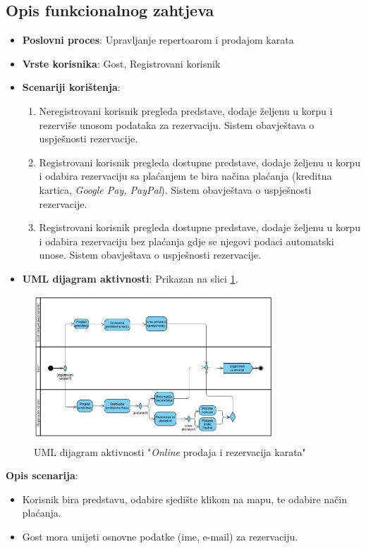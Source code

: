 \subsection{Opis funkcionalnog zahtjeva}  
\begin{itemize}  
    \item \textbf{Poslovni proces}: Upravljanje repertoarom i prodajom karata 
    \item \textbf{Vrste korisnika}: Gost, Registrovani korisnik 
    \item \textbf{Scenariji korištenja}:  
        \begin{enumerate}  
            \item Neregistrovani korisnik pregleda predstave, dodaje željenu u korpu i rezerviše unosom podataka za rezervaciju. Sistem obavještava o uspješnosti rezervacije.  
            \item Registrovani korisnik pregleda dostupne predstave, dodaje željenu u korpu i odabira rezervaciju sa plaćanjem te bira načina plaćanja (kreditna kartica, \textit{Google Pay, PayPal}). Sistem obavještava o uspješnosti rezervacije.  
            \item Registrovani korisnik pregleda dostupne predstave, dodaje željenu u korpu i odabira rezervaciju bez plaćanja gdje se njegovi podaci automatski unose. Sistem obavještava o uspješnosti rezervacije.  
        \end{enumerate}  
    \item \textbf{UML dijagram aktivnosti}: Prikazan na slici \ref{fig:fz2}.  
\end{itemize}  
\begin{figure}[H]
    \centering
    \includegraphics[width=0.8\textwidth]{Slike/Fz2.png}
    \caption{UML dijagram aktivnosti "\textit{Online} prodaja i rezervacija karata"}
    \label{fig:fz2}
\end{figure}
\sloppy  
    \textbf{Opis scenarija}:  
        \begin{itemize}  
            \item Korisnik bira predstavu, odabire sjedište klikom na mapu, te odabire način plaćanja.  
            \item Gost mora unijeti osnovne podatke (ime, e-mail) za rezervaciju.  
        \end{itemize}  
